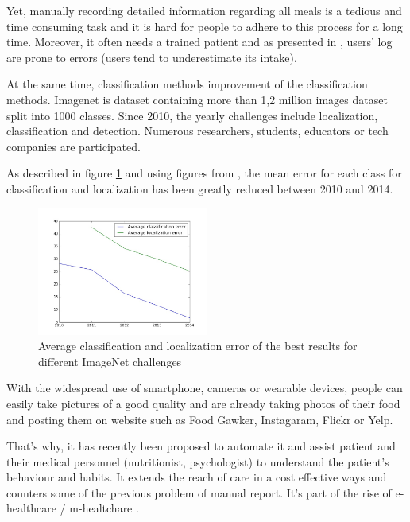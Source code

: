 Yet, manually recording detailed information regarding all meals is a tedious and time consuming task and it is hard for people to adhere to this process for a long time. Moreover, it often needs a trained patient and as presented in \cite{Lichtman1992}, users' log are prone to errors (users tend to underestimate its intake).

At the same time, classification methods improvement of the classification methods. Imagenet is dataset containing more than 1,2 million images dataset split into 1000 classes. Since 2010, the yearly challenges include localization, classification and detection. Numerous researchers, students, educators or tech companies are participated.

As described in figure \ref{fig:imagenet_results} and using figures from \cite{Russakovsky2015}, the 
mean error for each class for classification and localization has been greatly reduced between 2010 and 2014.

\begin{figure}[h]
    \centering
    \includegraphics[width=0.5\textwidth,  height=0.455\textwidth ]{img/imagenet}
    \caption{Average classification and localization error of the best results for different ImageNet challenges}
    \label{fig:imagenet_results}
\end{figure}

With the widespread use of smartphone, cameras or wearable devices, people can easily take pictures of a good quality and are already taking photos of their food and posting them on website such as Food Gawker, Instagaram, Flickr or Yelp.

That's why, it has recently been proposed to automate it and assist patient and their medical personnel (nutritionist, psychologist) to understand the patient's behaviour and habits. It extends the reach of care in a cost effective ways and counters some of the previous problem of manual report. It's part of the rise of e-healthcare / m-healtchare \cite{Hillestad2005, Menachemi2011}.

